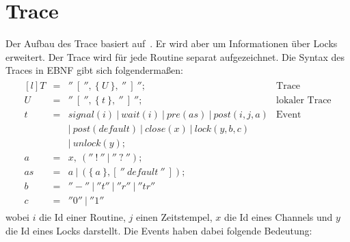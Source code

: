 \section{Trace}
Der Aufbau des Trace basiert auf~\cite{PPDP18}. Er wird aber um Informationen 
über Locks erweitert. Der Trace wird für jede Routine
separat aufgezeichnet. Die Syntax des Traces in EBNF gibt sich 
folgendermaßen:
\begin{align*}
  \begin{matrix*}[l]
    T & = & ''\ [\ '',\ \{\ U\ \},\ ''\ ]\ ''; & \text{Trace}\\
    U & = & ''\ [\ '',\ \{\ t\ \},\ ''\ ]\ ''; & \text{lokaler Trace} \\
    t & = & signal(i)\ |\ wait(i)\ |\ pre(as)\ |\ post(i, j, a) & \text{Event}\\
      &   & |\ post(default)\ |\ close(x)\ |\ lock(y, b, c) & \\
      &   & |\ unlock(y); & \\
    a & = & x,\ (''\ !\ ''\ |\ ''\ ?\ ''); & \\
    as & = & a\ |\ (\{\ a\ \}, [\ ''\ default\ ''\ ]); & \\
    b & = & ''-''\ |\ ''t''\ |\ ''r''\ |\ ''tr'' & \\
    c & = & ''0''\ |\ ''1''
  \end{matrix*}
\end{align*}
wobei $i$ die Id einer Routine, $j$ einen Zeitstempel, $x$ die Id eines 
Channels und $y$ die Id eines Locks darstellt. Die Events haben dabei folgende Bedeutung:
